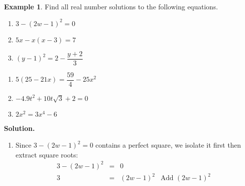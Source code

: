 \documentclass[11pt]{article}
\theoremstyle{definition}  %
\newtheorem{ex}{\bf Example}
\newcounter{HW}
\begin{document}
\begin{ex}\label{reviewquadraticex}  Find all real number solutions to the following equations.

\begin{multicols}{3}

\begin{enumerate}

\item $3 - (2w-1)^2 = 0$

\item $5x - x(x-3) = 7$

\item  $(y-1)^2 = 2 - \dfrac{y+2}{3}$ 

\setcounter{HW}{\value{enumi}}

\end{enumerate}
\end{multicols}

\begin{multicols}{3}

\begin{enumerate}

\setcounter{enumi}{\value{HW}}

\item $5(25 - 21x) = \dfrac{59}{4} - 25x^2$

\item $-4.9t^2 + 10t\sqrt{3} + 2 = 0$ 



\item $2x^2 = 3x^4 - 6$



\setcounter{HW}{\value{enumi}}

\end{enumerate}
\end{multicols}

{\bf Solution.}

\begin{enumerate}

\item  Since $3 - (2w-1)^2 = 0$ contains a perfect square, we isolate it first then extract square roots: \[ \begin{array}{rclr}

3 - (2w-1)^2 & = & 0 & \\

3 & = & (2w-1)^2 & \text{Add $(2w-1)^2$} \\


\end{array}\]
\end{enumerate}
\end{ex}
\end{document}
